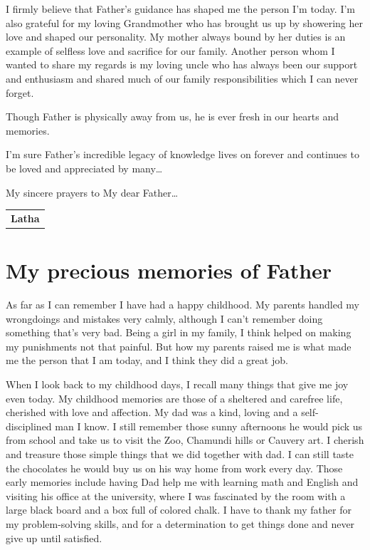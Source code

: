 I firmly believe that Father’s guidance has shaped me the person I’m today. I’m also grateful for my loving Grandmother who has brought us up by showering her love and shaped our personality. My mother always bound by her duties is an example of selfless love and sacrifice for our family. Another person whom I wanted to share my regards is my loving uncle who has always been our support and enthusiasm and shared much of our family responsibilities which I can never forget. 
\medskip

Though Father is physically away from us, he is ever fresh in our hearts and memories.
\medskip

I’m sure Father’s incredible legacy of knowledge lives on forever and continues to be loved and appreciated by many… 
\medskip

My sincere prayers to My dear Father… 
\bigskip

\begin{flushright}
\begin{tabular}{c}
\multicolumn{1}{p{2cm}}{\textbf{Latha}}
\end{tabular}
\end{flushright}
\newpage

\section*{My precious memories of Father}

As far as I can remember I have had a happy childhood. My parents handled my wrongdoings and mistakes very calmly, although I can’t remember doing something that’s very bad. Being a girl in my family, I think helped on making my punishments not that painful. But how my parents raised me is what made me the person that I am today, and I think they did a great job.
\medskip

When I look back to my childhood days, I recall many things that give me joy even today. My childhood memories are those of a sheltered and carefree life, cherished with love and affection. My dad was a kind, loving and a self-disciplined man I know. I still remember those sunny afternoons he would pick us from school and take us to visit the Zoo, Chamundi hills or Cauvery art. I cherish and treasure those simple things that we did together with dad. I can still taste the chocolates he would buy us on his way home from work every day. Those early memories include having Dad help me with learning math and English and visiting his office at the university, where I was fascinated by the room with a large black board and a box full of colored chalk. I have to thank my father for my problem-solving skills, and for a determination to get things done and never give up until satisfied.
\medskip

